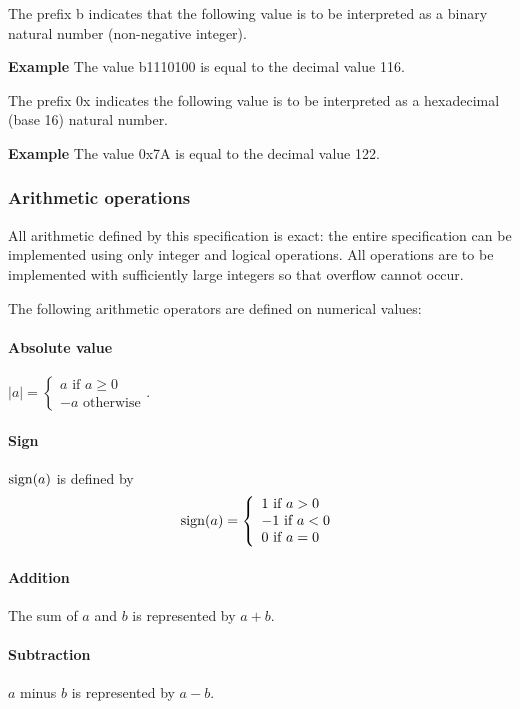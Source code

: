 The prefix b indicates that the following value is to be interpreted as a binary
natural number (non-negative integer). 

{\bf Example} The value b1110100 is equal to the decimal value 116. 

The prefix 0x indicates the following value is to be interpreted as a hexadecimal (base 16)
natural number. 

{\bf Example} The value 0x7A is equal to the decimal value 122. 

\subsubsection{Arithmetic operations}
\label{arithoperations}

All arithmetic defined by this specification is exact: the entire 
specification can be implemented using only integer and logical operations.
All operations are to be implemented with sufficiently large integers so 
that overflow cannot occur.

The following arithmetic operators are defined on numerical values:

\paragraph*{Absolute value} $|a|=\left\lbrace\begin{array}{l} a \text{ if $a\geq 0$}\\ 
                                                                                   -a \text{ otherwise} \end{array}\right.$.

\paragraph*{Sign} $\operatorname{sign}(a)$ is defined by
\[\operatorname{sign}(a)=
\left\{\begin{array}{l} 
1 \text{ if $a>0$} \\
-1 \text{ if $a<0$} \\
0 \text{ if $a=0$}
\end{array}\right.\]

\paragraph*{Addition} The sum of $a$ and $b$ is represented by $a+b$.

\paragraph*{Subtraction} $a$ minus $b$ is represented by $a-b$.

